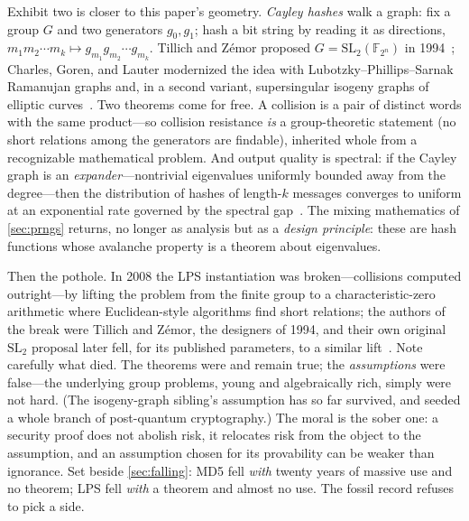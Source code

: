 Exhibit two is closer to this paper's geometry. \emph{Cayley hashes}
walk a graph: fix a group $G$ and two generators $g_0, g_1$; hash a bit
string by reading it as directions,
$m_1 m_2 \cdots m_k \mapsto g_{m_1} g_{m_2} \cdots g_{m_k}$. Tillich
and Z{\'e}mor proposed $G = \mathrm{SL}_2(\mathbb{F}_{2^n})$ in
1994~\citep{TillichZemor1994}; Charles, Goren, and Lauter modernized
the idea with Lubotzky--Phillips--Sarnak Ramanujan graphs and, in a
second variant, supersingular isogeny graphs of elliptic
curves~\citep{CharlesGorenLauter2009}. Two theorems come for free.
A collision is a pair of distinct words with the same product---so
collision resistance \emph{is} a group-theoretic statement (no short
relations among the generators are findable), inherited whole from a
recognizable mathematical problem. And output quality is spectral: if
the Cayley graph is an \emph{expander}---nontrivial eigenvalues
uniformly bounded away from the degree---then the distribution of
hashes of length-$k$ messages converges to uniform at an exponential
rate governed by the spectral gap~\citep{HooryLinialWigderson2006}.
The mixing mathematics of \cref{sec:prngs} returns, no longer as
analysis but as a \emph{design principle}: these are hash functions
whose avalanche property is a theorem about eigenvalues.

Then the pothole. In 2008 the LPS instantiation was broken---collisions
computed outright---by lifting the problem from the finite group to a
characteristic-zero arithmetic where Euclidean-style algorithms find
short relations; the authors of the break were Tillich and Z{\'e}mor,
the designers of 1994, and their own original $\mathrm{SL}_2$ proposal
later fell, for its published parameters, to a similar
lift~\citep{TillichZemor2008}. Note carefully what died. The theorems
were and remain true; the \emph{assumptions} were false---the
underlying group problems, young and algebraically rich, simply were
not hard. (The isogeny-graph sibling's assumption has so far survived,
and seeded a whole branch of post-quantum cryptography.) The moral is
the sober one: a security proof does not abolish risk, it relocates
risk from the object to the assumption, and an assumption chosen for
its provability can be weaker than ignorance. Set beside
\cref{sec:falling}: MD5 fell \emph{with} twenty years of massive use
and no theorem; LPS fell \emph{with} a theorem and almost no use. The
fossil record refuses to pick a side.

